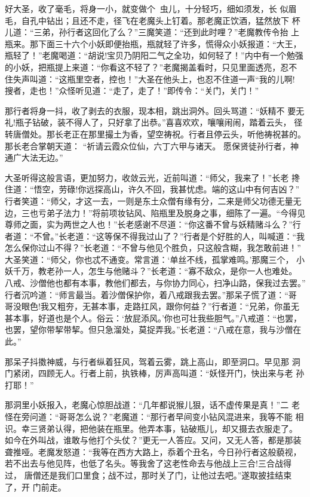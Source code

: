 好大圣，收了毫毛，将身一小，就变做个虫儿，十分轻巧，细如须发，长
似眉毛，自孔中钻出；且还不走，径飞在老魔头上钉着。那老魔正饮酒，猛然放下
杯儿道：“三弟，孙行者这回化了么？”三魔笑道：“还到此时哩？”老魔教传令抬
上瓶来。那下面三十六个小妖即便抬瓶，瓶就轻了许多，慌得众小妖报道：“大王，
瓶轻了！”老魔喝道：“胡说!宝贝乃阴阳二气之全功，如何轻了！”内中有一个勉强
的小妖，把瓶提上来道：“你看这不轻了？”老魔揭盖看时，只见里面透亮，忍不
住失声叫道：“这瓶里空者，控也！”大圣在他头上，也忍不住道一声“我的儿啊!
搜者，走也！”众怪听见道：“走了，走了！”即传令：“关门，关门！”

那行者将身一抖，收了剥去的衣服，现本相，跳出洞外。回头骂道：“妖精不
要无礼!瓶子钻破，装不得人了，只好拿了出恭。”喜喜欢欢，嚷嚷闹闹，踏着云头，
径转唐僧处。那长老正在那里撮土为香，望空祷祝。行者且停云头，听他祷祝甚的。
那长老合掌朝天道：
“祈请云霞众位仙，六丁六甲与诸天。
愿保贤徒孙行者，神通广大法无边。”

大圣听得这般言语，更加努力，收敛云光，近前叫道：“师父，我来了！”长老
搀住道：“悟空，劳碌!你远探高山，许久不回，我甚忧虑。端的这山中有何吉凶？”
行者笑道：“师父，才这一去，一则是东土众僧有缘有分，二来是师父功德无量无
边，三也亏弟子法力！”将前项妆钻风、陷瓶里及脱身之事，细陈了一遍。“今得见
尊师之面，实为两世之人也！”长老感谢不尽道：“你这番不曾与妖精赌斗么？”行
者道：“不曾。”长老道：“这等保不得我过山了？”行者是个好胜的人，叫喊道：“我
怎么保你过山不得？”长老道：“不曾与他见个胜负，只这般含糊，我怎敢前进！”
大圣笑道：“师父，你也忒不通变。常言道：‘单丝不线，孤掌难鸣。’那魔三个，
小妖千万，教老孙一人，怎生与他赌斗？”长老道：“寡不敌众，是你一人也难处。
八戒、沙僧他也都有本事，教他们都去，与你协力同心，扫净山路，保我过去罢。”
行者沉吟道：“师言最当。着沙僧保护你，着八戒跟我去罢。”那呆子慌了道：“哥
哥没眼色!我又粗夯，无甚本事，走路扛风，跟你何益？”行者道：“兄弟，你虽无
甚本事，好道也是个人。俗云：‘放屁添风。’你也可壮我些胆气。”八戒道：“也罢，
也罢，望你带挈带挈。但只急溜处，莫捉弄我。”长老道：“八戒在意，我与沙僧在
此。”

那呆子抖擞神威，与行者纵着狂风，驾着云雾，跳上高山，即至洞口。早见那
洞门紧闭，四顾无人。行者上前，执铁棒，厉声高叫道：“妖怪开门，快出来与老
孙打耶！”

那洞里小妖报入，老魔心惊胆战道：“几年都说猴儿狠，话不虚传果是真！”二
老怪在旁问道：“哥哥怎么说？”老魔道：“那行者早间变小钻风混进来，我等不能
相识。幸三贤弟认得，把他装在瓶里。他弄本事，钻破瓶儿，却又摄去衣服走了。
如今在外叫战，谁敢与他打个头仗？”更无一人答应。又问，又无人答，都是那装
聋推哑。老魔发怒道：“我等在西方大路上，忝着个丑名，今日孙行者这般藐视，
若不出去与他见阵，也低了名头。等我舍了这老性命去与他战上三合!三合战得过，
唐僧还是我们口里食；战不过，那时关了门，让他过去吧。”遂取披挂结束了，开
门前走。

